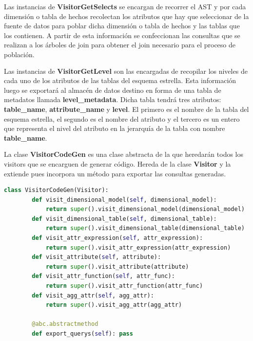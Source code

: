 Las instancias de \textbf{VisitorGetSelects} se encargan de recorrer el AST y por cada dimensión o tabla 
de hechos recolectan los atributos que hay que seleccionar de la fuente de datos 
para poblar dicha dimensión o tabla de hechos y las tablas que los contienen. A partir de esta información se confeccionan las consultas 
que se realizan a los \'arboles de join para obtener el join necesario para el proceso de población.

Las instancias de \textbf{VisitorGetLevel} son las encargadas de recopilar los niveles de cada uno de los 
atributos de las tablas del esquema estrella. Esta información luego se exportar\'a al almacén de datos 
destino en forma de una tabla de metadatos llamada \textbf{level\_metadata}. Dicha tabla tendrá tres atributos: 
\textbf{table\_name}, \textbf{attribute\_name} y \textbf{level}. El primero es el nombre de la tabla del esquema 
estrella, el segundo es el nombre del atributo y el tercero es un entero que representa el nivel del atributo 
en la jerarquía de la tabla con nombre \textbf{table\_name}.

La clase \textbf{VisitorCodeGen} es una clase abstracta de la que heredar\'an todos los visitors que 
se encarguen de generar código. Hereda de la clase \textbf{Visitor} y la extiende pues incorpora un 
método para exportar las consultas generadas.

\begin{lstlisting}[label={code:vcodegen}, caption={Clase VisitorCodeGen}, language={python}]
    class VisitorCodeGen(Visitor):
        def visit_dimensional_model(self, dimensional_model):
            return super().visit_dimensional_model(dimensional_model)
        def visit_dimensional_table(self, dimensional_table):
            return super().visit_dimensional_table(dimensional_table)
        def visit_attr_expression(self, attr_expression):
            return super().visit_attr_expression(attr_expression)
        def visit_attribute(self, attribute):
            return super().visit_attribute(attribute)
        def visit_attr_function(self, attr_func):
            return super().visit_attr_function(attr_func)
        def visit_agg_attr(self, agg_attr):
            return super().visit_agg_attr(agg_attr)

        @abc.abstractmethod
        def export_querys(self): pass
\end{lstlisting}

